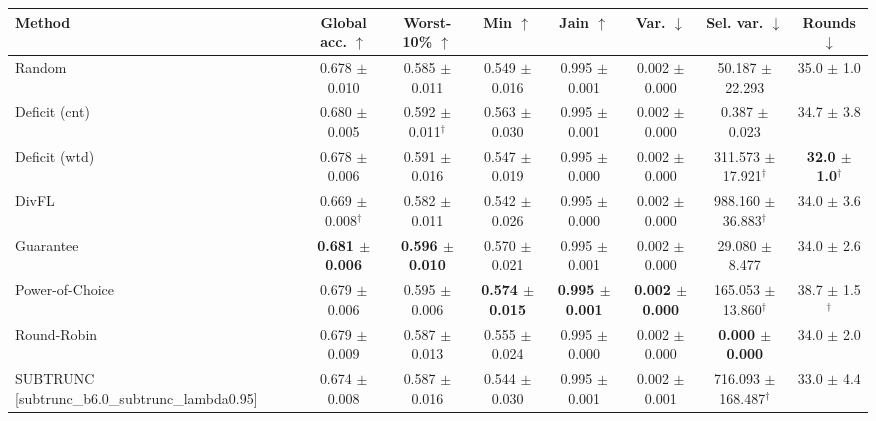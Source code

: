 \begin{tabular}{lccccccc}
\toprule
Method & Global acc. $\uparrow$ & Worst-10\% $\uparrow$ & Min $\uparrow$ & Jain $\uparrow$ & Var. $\downarrow$ & Sel. var. $\downarrow$ & Rounds $\downarrow$ \\
\midrule
Random & 0.678 $\pm$ 0.010 & 0.585 $\pm$ 0.011 & 0.549 $\pm$ 0.016 & 0.995 $\pm$ 0.001 & 0.002 $\pm$ 0.000 & 50.187 $\pm$ 22.293 & 35.0 $\pm$ 1.0 \\
Deficit (cnt) & 0.680 $\pm$ 0.005 & 0.592 $\pm$ 0.011$^\dagger$ & 0.563 $\pm$ 0.030 & 0.995 $\pm$ 0.001 & 0.002 $\pm$ 0.000 & 0.387 $\pm$ 0.023 & 34.7 $\pm$ 3.8 \\
Deficit (wtd) & 0.678 $\pm$ 0.006 & 0.591 $\pm$ 0.016 & 0.547 $\pm$ 0.019 & 0.995 $\pm$ 0.000 & 0.002 $\pm$ 0.000 & 311.573 $\pm$ 17.921$^\dagger$ & \textbf{32.0 $\pm$ 1.0}$^\dagger$ \\
DivFL & 0.669 $\pm$ 0.008$^\dagger$ & 0.582 $\pm$ 0.011 & 0.542 $\pm$ 0.026 & 0.995 $\pm$ 0.000 & 0.002 $\pm$ 0.000 & 988.160 $\pm$ 36.883$^\dagger$ & 34.0 $\pm$ 3.6 \\
Guarantee & \textbf{0.681 $\pm$ 0.006} & \textbf{0.596 $\pm$ 0.010} & 0.570 $\pm$ 0.021 & 0.995 $\pm$ 0.001 & 0.002 $\pm$ 0.000 & 29.080 $\pm$ 8.477 & 34.0 $\pm$ 2.6 \\
Power-of-Choice & 0.679 $\pm$ 0.006 & 0.595 $\pm$ 0.006 & \textbf{0.574 $\pm$ 0.015} & \textbf{0.995 $\pm$ 0.001} & \textbf{0.002 $\pm$ 0.000} & 165.053 $\pm$ 13.860$^\dagger$ & 38.7 $\pm$ 1.5$^\dagger$ \\
Round-Robin & 0.679 $\pm$ 0.009 & 0.587 $\pm$ 0.013 & 0.555 $\pm$ 0.024 & 0.995 $\pm$ 0.000 & 0.002 $\pm$ 0.000 & \textbf{0.000 $\pm$ 0.000} & 34.0 $\pm$ 2.0 \\
SUBTRUNC [subtrunc\_b6.0\_subtrunc\_lambda0.95] & 0.674 $\pm$ 0.008 & 0.587 $\pm$ 0.016 & 0.544 $\pm$ 0.030 & 0.995 $\pm$ 0.001 & 0.002 $\pm$ 0.001 & 716.093 $\pm$ 168.487$^\dagger$ & 33.0 $\pm$ 4.4 \\
\bottomrule
\end{tabular}

